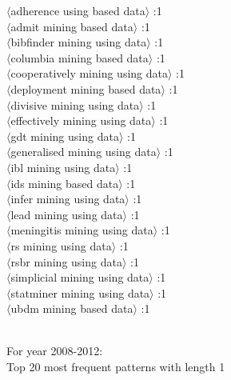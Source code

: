 \documentclass[11pt,a4paper,fleqn]{article}
\begin{document}
\begin{multicols}{2} \noindent
$\langle$adherence using based data$\rangle$ :1\\
$\langle$admit mining based data$\rangle$ :1\\
$\langle$bibfinder mining using data$\rangle$ :1\\
$\langle$columbia mining based data$\rangle$ :1\\
$\langle$cooperatively mining using data$\rangle$ :1\\
$\langle$deployment mining based data$\rangle$ :1\\
$\langle$divisive mining using data$\rangle$ :1\\
$\langle$effectively mining using data$\rangle$ :1\\
$\langle$gdt mining using data$\rangle$ :1\\
$\langle$generalised mining using data$\rangle$ :1\\
$\langle$ibl mining using data$\rangle$ :1\\
$\langle$ids mining based data$\rangle$ :1\\
$\langle$infer mining using data$\rangle$ :1\\
$\langle$lead mining using data$\rangle$ :1\\
$\langle$meningitis mining using data$\rangle$ :1\\
$\langle$rs mining using data$\rangle$ :1\\
$\langle$rsbr mining using data$\rangle$ :1\\
$\langle$simplicial mining using data$\rangle$ :1\\
$\langle$statminer mining using data$\rangle$ :1\\
$\langle$ubdm mining based data$\rangle$ :1\\
\end{multicols} \noindent \\
For year 2008-2012:\\
Top 20 most frequent patterns with length 1
\end{document}
